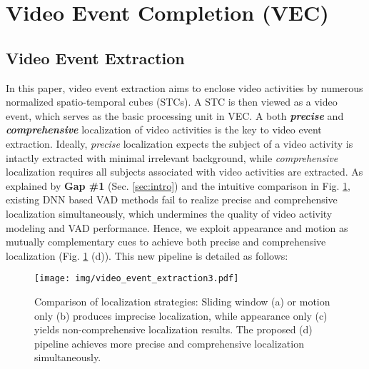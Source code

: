 \documentclass[sigconf]{acmart}
\begin{document}
\section{Video Event Completion (VEC)}
\label{sec:method}
\subsection{Video Event Extraction}

In this paper, video event extraction aims to enclose video activities by numerous normalized spatio-temporal cubes (STCs). A STC is then viewed as a video event, which serves as the basic processing unit in VEC. A both \textbf{\textit{precise}} and \textbf{\textit{comprehensive}} localization of video activities is the key to video event extraction. Ideally, \textit{precise} localization expects the subject of a video activity is intactly extracted with minimal irrelevant background, while \textit{comprehensive} localization requires all subjects associated with video activities are extracted. As explained by \textbf{Gap \#1} (Sec. \ref{sec:intro}) and the intuitive comparison in Fig. \ref{fig:visual_vee}, existing DNN based VAD methods fail to realize precise and comprehensive localization simultaneously, which undermines the quality of video activity modeling and VAD performance. Hence, we exploit appearance and motion as mutually complementary cues to achieve both precise and comprehensive localization (Fig. \ref{fig:visual_vee} (d)). This new pipeline is detailed as follows:

\begin{figure}
	\centering
	\texttt{[image: img/video\_event\_extraction3.pdf]}
	\caption{Comparison of localization strategies: Sliding window (a) or motion only (b) produces imprecise localization, while appearance only (c) yields non-comprehensive localization results. The proposed (d) pipeline achieves more precise and comprehensive localization simultaneously.}
	\label{fig:visual_vee}
\end{figure}
\end{document}
